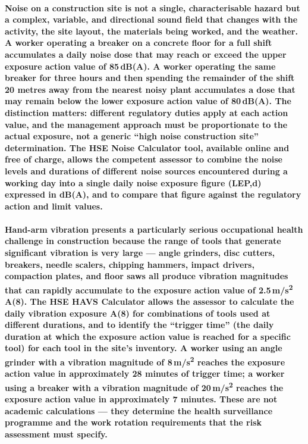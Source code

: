 \paragraph{Noise on a construction site is not a single, characterisable hazard but a complex, variable, and directional sound field that changes with the activity, the site layout, the materials being worked, and the weather. A worker operating a breaker on a concrete floor for a full shift accumulates a daily noise dose that may reach or exceed the upper exposure action value of 85\,dB(A). A worker operating the same breaker for three hours and then spending the remainder of the shift 20 metres away from the nearest noisy plant accumulates a dose that may remain below the lower exposure action value of 80\,dB(A). The distinction matters: different regulatory duties apply at each action value, and the management approach must be proportionate to the actual exposure, not a generic ``high noise construction site'' determination. The HSE Noise Calculator tool, available online and free of charge, allows the competent assessor to combine the noise levels and durations of different noise sources encountered during a working day into a single daily noise exposure figure (LEP,d) expressed in dB(A), and to compare that figure against the regulatory action and limit values.}

\paragraph{Hand-arm vibration presents a particularly serious occupational health challenge in construction because the range of tools that generate significant vibration is very large --- angle grinders, disc cutters, breakers, needle scalers, chipping hammers, impact drivers, compaction plates, and floor saws all produce vibration magnitudes that can rapidly accumulate to the exposure action value of 2.5\,m/s\textsuperscript{2} A(8). The HSE HAVS Calculator allows the assessor to calculate the daily vibration exposure A(8) for combinations of tools used at different durations, and to identify the ``trigger time'' (the daily duration at which the exposure action value is reached for a specific tool) for each tool in the site's inventory. A worker using an angle grinder with a vibration magnitude of 8\,m/s\textsuperscript{2} reaches the exposure action value in approximately 28 minutes of trigger time; a worker using a breaker with a vibration magnitude of 20\,m/s\textsuperscript{2} reaches the exposure action value in approximately 7 minutes. These are not academic calculations --- they determine the health surveillance programme and the work rotation requirements that the risk assessment must specify.}

